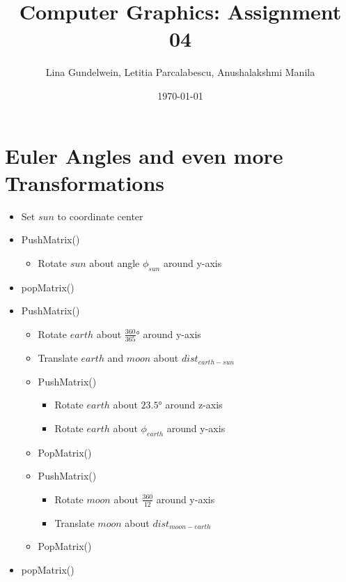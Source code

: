 \documentclass{article}
\title{Computer Graphics: Assignment 04} %
\author{Lina Gundelwein, Letitia Parcalabescu, Anushalakshmi Manila} %
\date{\today} %
\begin{document}
\maketitle 

\section{Euler Angles and even more Transformations}

\begin{itemize}
\item Set $sun$ to coordinate center
\item PushMatrix()
\begin{itemize}
\item Rotate $sun$ about angle $\phi_{sun}$ around y-axis
\end{itemize}
\item popMatrix()
\end{itemize}


\begin{itemize}
\item PushMatrix()
\begin{itemize}
\item Rotate $earth$ about $\frac{360}{365}$° around y-axis
\item Translate $earth$ and $moon$ about $dist_{earth-sun}$
\item PushMatrix()
\begin{itemize}
\item Rotate $earth$ about $23.5°$ around z-axis
\item Rotate $earth$ about $\phi_{earth}$ around y-axis
\end{itemize}
\item PopMatrix()
\item PushMatrix()
\begin{itemize}
\item Rotate $moon$ about $\frac{360}{12}$ around y-axis
\item Translate $moon$ about $dist_{moon-earth}$
\end{itemize}
\item PopMatrix()
\end{itemize}

\item popMatrix()
\end{itemize}
\end{document}
